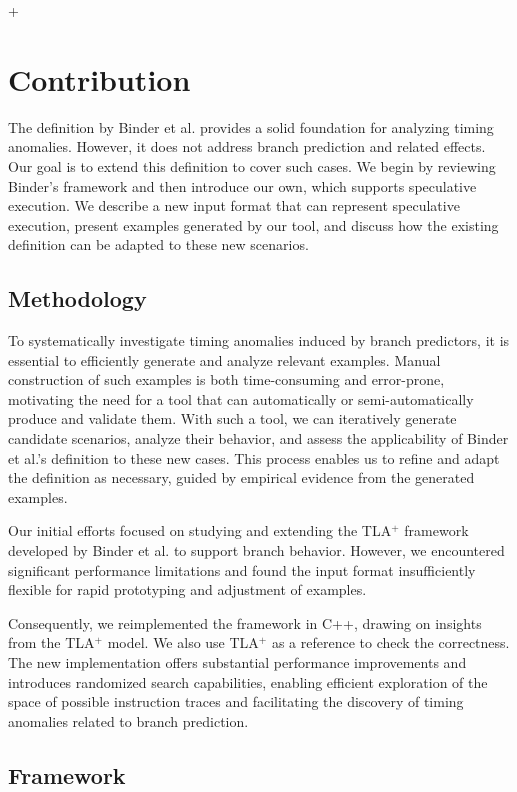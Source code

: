 +\chapter{Contribution}
The definition by Binder et al. \cite{binder_definitions_2022} provides a solid foundation for analyzing timing anomalies. However, it does not address branch prediction and related effects. Our goal is to extend this definition to cover such cases. We begin by reviewing Binder's framework and then introduce our own, which supports speculative execution. We describe a new input format that can represent speculative execution, present examples generated by our tool, and discuss how the existing definition can be adapted to these new scenarios.

\section{Methodology}
To systematically investigate timing anomalies induced by branch predictors, it is essential to efficiently generate and analyze relevant examples. Manual construction of such examples is both time-consuming and error-prone, motivating the need for a tool that can automatically or semi-automatically produce and validate them. With such a tool, we can iteratively generate candidate scenarios, analyze their behavior, and assess the applicability of Binder et al.'s definition to these new cases. This process enables us to refine and adapt the definition as necessary, guided by empirical evidence from the generated examples.

Our initial efforts focused on studying and extending the TLA$^+$ \cite{lamport_specifying_2003} framework developed by Binder et al.  to support branch behavior. However, we encountered significant performance limitations and found the input format insufficiently flexible for rapid prototyping and adjustment of examples.

Consequently, we reimplemented the framework in C++, drawing on insights from the TLA$^+$ model. We also use TLA$^+$ as a reference to check the correctness. The new implementation offers substantial performance improvements and introduces randomized search capabilities, enabling efficient exploration of the space of possible instruction traces and facilitating the discovery of timing anomalies related to branch prediction.

\section{Framework}

